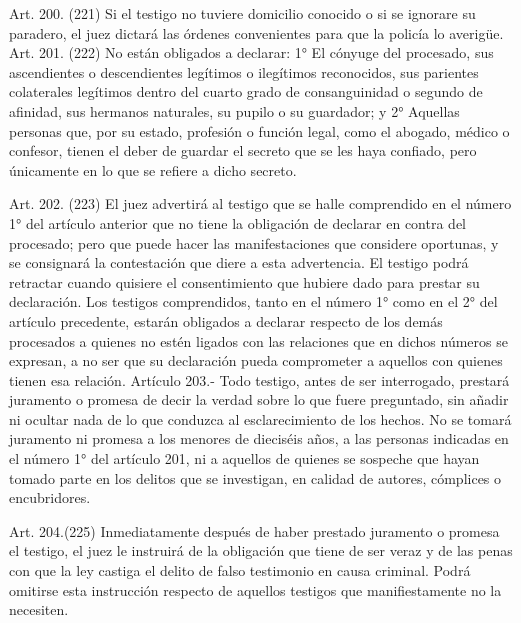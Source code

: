     Art. 200. (221) Si el testigo no tuviere domicilio conocido o si se ignorare su paradero, el juez dictará las órdenes convenientes para que la policía lo averigüe.
    Art. 201. (222) No están obligados a declarar:
    1° El cónyuge del procesado, sus ascendientes o descendientes legítimos o ilegítimos reconocidos, sus parientes colaterales legítimos dentro del cuarto grado de consanguinidad o segundo de afinidad, sus hermanos naturales, su pupilo o su guardador; y
    2° Aquellas personas que, por su estado, profesión o función legal, como el abogado, médico o confesor, tienen el deber de guardar el secreto que se les haya confiado, pero únicamente en lo que se refiere a dicho secreto.



    Art. 202. (223) El juez advertirá al testigo que se halle comprendido en el número 1° del artículo anterior que no tiene la obligación de declarar en contra del procesado; pero que puede hacer las manifestaciones que considere oportunas, y se consignará la contestación que diere a esta advertencia. El testigo podrá retractar cuando quisiere el consentimiento que hubiere dado para prestar su declaración.
    Los testigos comprendidos, tanto en el número 1° como en el 2° del artículo precedente, estarán obligados a declarar respecto de los demás procesados a quienes no estén ligados con las relaciones que en dichos números se expresan, a no ser que su declaración pueda comprometer a aquellos con quienes tienen esa relación.
    Artículo 203.- Todo testigo, antes de ser interrogado, prestará juramento o promesa de decir la verdad sobre lo que fuere preguntado, sin añadir ni ocultar nada de lo que conduzca al esclarecimiento de los hechos.
    No se tomará juramento ni promesa a los menores de dieciséis años, a las personas indicadas en el número 1° del artículo 201, ni a aquellos de quienes se sospeche que hayan tomado parte en los delitos que se investigan, en calidad de autores, cómplices o encubridores.

    Art. 204.(225) Inmediatamente después de haber prestado juramento o promesa el testigo, el juez le instruirá de la obligación que tiene de ser veraz y de las penas con que la ley castiga el delito de falso testimonio en causa criminal.
    Podrá omitirse esta instrucción respecto de aquellos testigos que manifiestamente no la necesiten.

